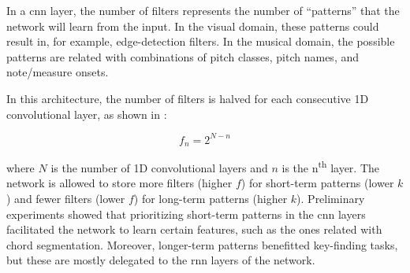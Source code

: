 
In a \gls{cnn} layer, the number of filters represents the
number of ``patterns'' that the network will learn from the
input. In the visual domain, these patterns could result in,
for example, edge-detection filters. In the musical domain,
the possible patterns are related with combinations of pitch
classes, pitch names, and note/measure onsets.

In this architecture, the number of filters is halved for
each consecutive 1D convolutional layer, as shown in
:

\begin{equation}
    \label{eq:number_of_filters}
    f_n = 2^{N - n}
\end{equation}

where $N$ is the number of 1D convolutional layers and $n$
is the n\textsuperscript{th} layer. The network is allowed
to store more filters (higher $f$) for short-term patterns
(lower $k$) and fewer filters (lower $f$) for long-term
patterns (higher $k$). Preliminary experiments showed that
prioritizing short-term patterns in the \gls{cnn} layers
facilitated the network to learn certain features, such as
the ones related with chord segmentation. Moreover,
longer-term patterns benefitted key-finding tasks, but these
are mostly delegated to the \gls{rnn} layers of the network. 
